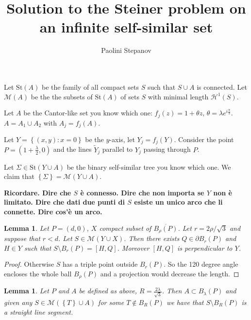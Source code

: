 \documentclass{article}
\title{Solution to the Steiner problem on an infinite self-similar set}
\author{Paolini Stepanov}
\renewcommand{\H}{\mathcal H}
\newcommand{\ENCLOSE}[1]{\left\{#1\right\}}
\newcommand{\St}{\mathrm{St}}
\newcommand{\M}{\mathcal{M}}
\renewcommand{\H}{\mathcal{H}}
\newtheorem{lemma}[theorem]{Lemma}
\theoremstyle{definition}
\theoremstyle{remark}
\begin{document}
\maketitle
Let $\St(A)$ be the family of all compact sets $S$ such that 
$S\cup A$ is connected.
Let $\M(A)$ be the the subsets of $\St(A)$ of sets $S$ 
with minimal length $\H^1(S)$.

Let $A$ be the Cantor-like set you know which one: 
$f_j(z) = 1 + \theta z$,
$\theta = \lambda e^{i \frac \pi 3}$.
$A=A_1\cup A_2$ 
with $A_j = f_j(A)$.

Let $Y=\ENCLOSE{(x,y)\colon x=0}$ be the $y$-axis,
let $Y_j = f_j(Y)$.
Consider the point $P=(1+\frac\lambda 2,0)$ 
and the lines $\tilde Y_j$ parallel to $Y_j$ 
passing through $P$.

Let $\Sigma\in \St(Y\cup A)$ be the binary self-similar 
tree you know which one.
We claim that $\ENCLOSE{\Sigma} = \M(Y\cup A)$.

\textbf{Ricordare. Dire che $S$ è connesso. 
Dire che non importa se $Y$ non è limitato.
Dire che dati due punti di $S$ esiste un unico arco che li connette.
Dire cos'è un arco. }

\begin{lemma}\label{lm:base}
  Let $P=(d,0)$, $X$ compact subset of $\overline{B_\rho(P)}$.
  Let $r=2\rho/\sqrt 3$ and suppose that $r<d$.
  Let $S \in \M(Y\cup X)$.
  Then there exists $Q\in \partial B_r(P)$ and $H\in Y$
  such that $S\setminus B_r(P) = [H,Q]$.
  Moreover $[H,Q]$ is perpendicular to $Y$.
\end{lemma}
\begin{proof}
    Otherwise $S$ has a triple point outside $B_r(P)$.
    So the 120 degree angle encloses the whole ball $B_\rho(P)$ 
    and a projection would decrease the length.
\end{proof}
  
\begin{lemma}\label{lm:01}
  Let $P$ and $A$ be defined as above,
  $R=\frac{2\lambda}{\sqrt 3}$.
  Then $A\subset B_\lambda(P)$ and 
  given any $S\in \M(\ENCLOSE{T}\cup A)$ 
  for some $T\not \in B_R(P)$
  we have that $S\setminus B_R(P)$ is a straight line segment.
\end{lemma}
\end{document}
